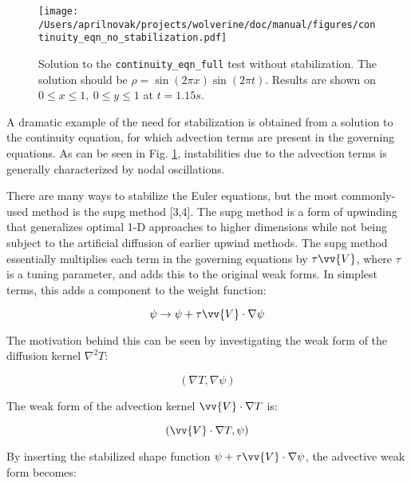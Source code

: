 \documentclass[10pt]{article}
\numberwithin{equation}{section} %
\begin{document}
\begin{figure}[H]
  \centering
  \texttt{[image: /Users/aprilnovak/projects/wolverine/doc/manual/figures/continuity\_eqn\_no\_stabilization.pdf]}
  \caption{Solution to the \texttt{continuity\_eqn\_full} test without stabilization. The solution should be \(\rho=\sin{(2\pi x)}\sin{(2\pi t)}\). Results are shown on \(0\leq x\leq 1,\ 0\leq y\leq 1\) at \(t=1.15 s\).}
  \label{fig:continuity_eqn_no_stabilization}
\end{figure}

A dramatic example of the need for stabilization is obtained from a solution to the continuity equation, for which advection terms are present in the governing equations. As can be seen in Fig. \ref{fig:continuity_eqn_no_stabilization}, instabilities due to the advection terms is generally characterized by nodal oscillations.\newline 

There are many ways to stabilize the Euler equations, but the most commonly-used method is the \gls{supg} method [3,4]. The \gls{supg} method is a form of upwinding that generalizes optimal 1-D approaches to higher dimensions while not being subject to the artificial diffusion of earlier upwind methods. The \gls{supg} method essentially multiplies each term in the governing equations by \(\tau\vv{V}\), where \(\tau\) is a tuning parameter, and adds this to the original weak forms. In simplest terms, this adds a component to the weight function:

\begin{equation}
\label{eq:SUPGPsi}
\psi\rightarrow\psi+\tau\vv{V}\cdot\nabla\psi
\end{equation}

The motivation behind this can be seen by investigating the weak form of the diffusion kernel \(\nabla^2 T\):

\begin{equation}
\label{eq:DiffusionWeakForm}
(\nabla T, \nabla\psi)
\end{equation}

The weak form of the advection kernel \(\vv{V}\cdot\nabla T\) is:

\begin{equation}
\label{eq:AdvectiveWeakForm}
(\vv{V}\cdot\nabla T,\psi)
\end{equation}

By inserting the stabilized shape function \(\psi+\tau\vv{V}\cdot\nabla\psi\), the advective weak form becomes:
\end{document}

